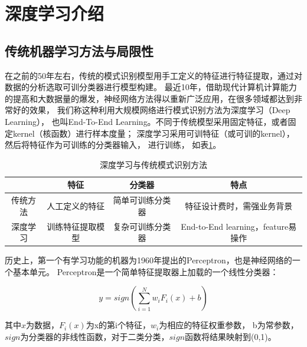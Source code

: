 \section{深度学习介绍}

\subsection{传统机器学习方法与局限性}

在之前的50年左右，传统的模式识别模型用手工定义的特征进行特征提取，通过对数据的分析选取可训分类器进行模型构建。 最近10年，借助现代计算机计算能力的提高和大数据量的爆发，神经网络方法得以重新广泛应用，在很多领域都达到非常好的效果， 我们称这种利用大规模网络进行模式识别方法为深度学习（Deep Learning）， 也叫End-To-End Learning。不同于传统模型采用固定特征，或者固定kernel（核函数）进行样本度量； 深度学习采用可训特征（或可训的kernel）， 然后将特征作为可训练的分类器输入， 进行训练， 如表\ref{Tab:dl_overview_compare}。

\begin{table}[ht]
\centering
  \caption{深度学习与传统模式识别方法}
  \begin{tabular}{|c||c|c|c|}
  \hline
   & 特征 & 分类器 & 特点\\
  \hline\hline
   传统方法 & 人工定义的特征 & 简单可训练分类器 & 特征设计费时，需强业务背景\\
  \hline
  深度学习 & 训练特征提取模型 & 复杂可训练分类器 & End-to-End learning，feature易操作\\
  \hline
  \end{tabular}
  \centering \label{Tab:dl_overview_compare}
\end{table}

历史上，第一个有学习功能的机器为1960年提出的Perceptron\cite{rosenblatt1960perceptron}，也是神经网络的一个基本单元。 Perceptron是一个简单特征提取器上加载的一个线性分类器： 


\begin{equation}
\label{Eq:Perceptron}
y=sign(\sum_{i=1}^N{w_iF_i(x)}+b)
\end{equation}


其中$x$为数据，$F_i(x)$为x的第i个特征，$w_i$为相应的特征权重参数， b为常参数， $sign$为分类器的非线性函数，对于二类分类，$sign$函数将结果映射到(0,1)。

